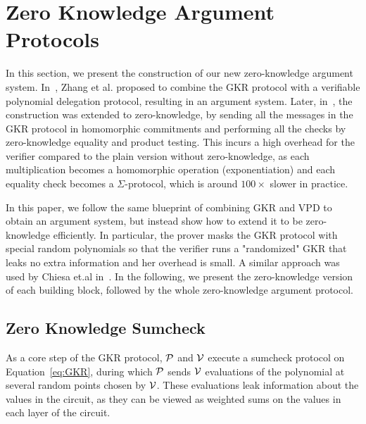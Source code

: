 
\section{Zero Knowledge Argument Protocols}\label{sec:zkp}

In this section, we present the construction of our new zero-knowledge argument system. In~\cite{zhang2017vsql}, Zhang et al. proposed to combine the GKR protocol with a verifiable polynomial delegation protocol, resulting in an argument system. Later, in~\cite{zkvpd,hyrax}, the construction was extended to zero-knowledge, by sending all the messages in the GKR protocol in homomorphic commitments and performing all the checks by zero-knowledge equality and product testing. This incurs a high overhead for the verifier compared to the plain version without zero-knowledge, as each multiplication becomes a homomorphic operation (exponentiation) and each equality check becomes a $\Sigma$-protocol, which is around $100\times$ slower in practice.

In this paper, we follow the same blueprint of combining GKR and VPD to obtain an argument system, but instead show how to extend it to be zero-knowledge efficiently. In particular, the prover masks the GKR protocol with special random polynomials so that the verifier runs a "randomized" GKR that leaks no extra information and her overhead is small. A similar approach was used by Chiesa et.al in~\cite{zksumcheck}. In the following, we present the zero-knowledge version of each building block, followed by the whole zero-knowledge argument protocol.

\subsection{Zero Knowledge Sumcheck}\label{subsec:zksumcheck}
As a core step of the GKR protocol, $\P$ and $\V$ execute a sumcheck protocol on Equation~\ref{eq:GKR}, during which $\P$ sends $\V$ evaluations of the polynomial at several random points chosen by $\V$. These evaluations leak information about the values in the circuit, as they can be viewed as weighted sums on the values in each layer of the circuit. 


